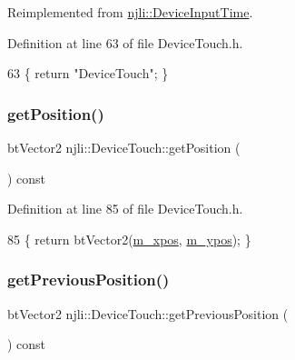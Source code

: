Reimplemented from \mbox{\hyperlink{classnjli_1_1_device_input_time_a2e5cdadd44d1ee2d7d7136e91f2bcafb}{njli\+::\+Device\+Input\+Time}}.



Definition at line 63 of file Device\+Touch.\+h.


\begin{DoxyCode}
63 \{ \textcolor{keywordflow}{return} \textcolor{stringliteral}{"DeviceTouch"}; \}
\end{DoxyCode}
\mbox{\label{classnjli_1_1_device_touch_aefb706600a5f23104c7dd8808ffe4e2d}} 
\subsubsection{\texorpdfstring{get\+Position()}{getPosition()}}
{\footnotesize\ttfamily bt\+Vector2 njli\+::\+Device\+Touch\+::get\+Position (\begin{DoxyParamCaption}{ }\end{DoxyParamCaption}) const\hspace{0.3cm}{\ttfamily [inline]}}



Definition at line 85 of file Device\+Touch.\+h.


\begin{DoxyCode}
85 \{ \textcolor{keywordflow}{return} btVector2(\mbox{\hyperlink{classnjli_1_1_device_touch_aa459469f52287f2085402117c13512f8}{m\_xpos}}, \mbox{\hyperlink{classnjli_1_1_device_touch_aec3c40c2adb1ba1bf5a13bf366bd3b6d}{m\_ypos}}); \}
\end{DoxyCode}
\mbox{\label{classnjli_1_1_device_touch_a4808a978398d3bd79d49c389d7a3752e}} 
\subsubsection{\texorpdfstring{get\+Previous\+Position()}{getPreviousPosition()}}
{\footnotesize\ttfamily bt\+Vector2 njli\+::\+Device\+Touch\+::get\+Previous\+Position (\begin{DoxyParamCaption}{ }\end{DoxyParamCaption}) const\hspace{0.3cm}{\ttfamily [inline]}}



